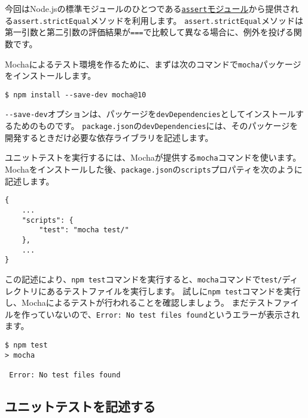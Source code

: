 今回はNode.jsの標準モジュールのひとつである\href{https://nodejs.org/api/assert.html}{\texttt{assert}モジュール}から提供される\texttt{assert.strictEqual}メソッドを利用します。
\texttt{assert.strictEqual}メソッドは第一引数と第二引数の評価結果が\texttt{===}で比較して異なる場合に、例外を投げる関数です。

Mochaによるテスト環境を作るために、まずは次のコマンドで\texttt{mocha}パッケージをインストールします。

\begin{lstlisting}
$ npm install --save-dev mocha@10
\end{lstlisting}

\texttt{-\/-save-dev}オプションは、パッケージを\texttt{devDependencies}としてインストールするためのものです。
\texttt{package.json}の\texttt{devDependencies}には、そのパッケージを開発するときだけ必要な依存ライブラリを記述します。

ユニットテストを実行するには、Mochaが提供する\texttt{mocha}コマンドを使います。
Mochaをインストールした後、\texttt{package.json}の\texttt{scripts}プロパティを次のように記述します。\enlargethispage{\baselineskip}

\begin{lstlisting}
{
    ...
    "scripts": {
        "test": "mocha test/"
    },
    ...
}
\end{lstlisting}
\newpage
この記述により、\texttt{npm test}コマンドを実行すると、\texttt{mocha}コマンドで\texttt{test/}ディレクトリにあるテストファイルを実行します。
試しに\texttt{npm test}コマンドを実行し、Mochaによるテストが行われることを確認しましょう。
まだテストファイルを作っていないので、\texttt{Error: No test files found}というエラーが表示されます。

\begin{lstlisting}
$ npm test
> mocha

 Error: No test files found
\end{lstlisting}
\vspace{-4mm}
\hypertarget{write-unit-test}{%
\subsection{ユニットテストを記述する}\label{write-unit-test}}

